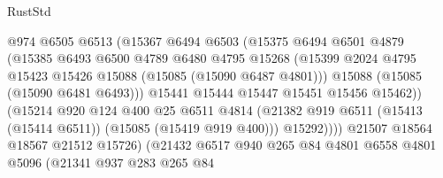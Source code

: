 \begin{lexlean}{RustStd}
\begin{coremodule}
                                @974
                                @6505
                                @6513
                                (@15367
                                  @6494
                                  @6503
                                  (@15375
                                    @6494
                                    @6501
                                    @4879
                                    (@15385
                                      @6493
                                      @6500
                                      @4789
                                      @6480
                                      @4795
                                      @15268
                                      (@15399
                                        @2024
                                        @4795
                                        @15423
                                        @15426
                                        @15088
                                        (@15085 (@15090 @6487 @4801)))
                                      @15088
                                      (@15085 (@15090 @6481 @6493)))
                                    @15441
                                    @15444
                                    @15447
                                    @15451
                                    @15456
                                    @15462))
                                (@15214
                                  @920
                                  @124
                                  @400
                                  @25
                                  @6511
                                  @4814
                                  (@21382
                                    @919
                                    @6511
                                    (@15413 (@15414 @6511))
                                    (@15085 (@15419 @919 @400)))
                                  @15292))))
                          @21507
                          @18564
                          @18567
                          @21512
                          @15726)
                        (@21432
                          @6517
                          @940
                          @265
                          @84
                          @4801
                          @6558
                          @4801
                          @5096
                          (@21341
                            @937
                            @283
                            @265
                            @84

\end{coremodule}
\end{lexlean}

